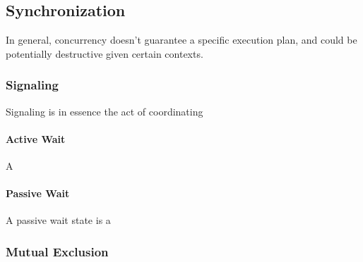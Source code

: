 \documentclass[12pt,a4paper,teal]{bbe}
\begin{document}
	
	\subsection{Synchronization}
	In general, concurrency doesn't guarantee a specific execution plan, and could
	be potentially destructive given certain contexts. 
	\subsubsection{Signaling}
	Signaling is in essence the act of coordinating 
	\paragraph{Active Wait}
	A
	\paragraph{Passive Wait}
	A passive wait state is a
	\subsubsection{Mutual Exclusion}
	
\end{document}
